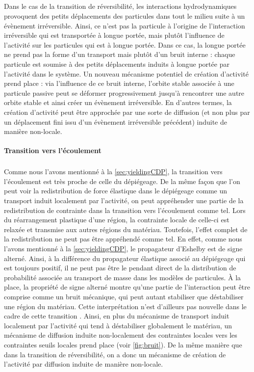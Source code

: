 \subparagraph{}Dans le cas de la transition de réversibilité, les interactions hydrodynamiques provoquent des petits déplacements des particules dans tout le milieu suite à un évènement irréversible. Ainsi, ce n'est pas la particule à l'origine de l'interaction irréversible qui est transportée à longue portée, mais plutôt l'influence de l'activité sur les particules qui est à longue portée. Dans ce cas, la longue portée ne prend pas la forme d'un transport mais plutôt d'un bruit interne : chaque particule est soumise à des petits déplacements induits à longue portée par l'activité dans le système. Un nouveau mécanisme potentiel de création d'activité prend place : via l'influence de ce bruit interne, l'orbite stable associée à une particule passive peut se déformer progressivement jusqu'à rencontrer une autre orbite stable et ainsi créer un évènement irréversible. En d'autres termes, la création d'activité peut être approchée par une sorte de diffusion (et non plus par un déplacement fini issu d'un évènement irréversible précédent) induite de manière non-locale.

\paragraph{Transition vers l'écoulement}

\subparagraph{}Comme nous l'avons mentionné à la \autoref{sec:yieldingCDP}, la transition vers l'écoulement est très proche de celle du dépiégeage. De la même façon que l'on peut voir la redistribution de force élastique dans le dépiégeage comme un transport induit localement par l'activité, on peut appréhender une partie de la redistribution de contrainte dans la transition vers l'écoulement comme tel. Lors du réarrangement plastique d'une région, la contrainte locale de celle-ci est relaxée et transmise aux autres régions du matériau. Toutefois, l'effet complet de la redistribution ne peut pas être appréhendé comme tel. En effet, comme nous l'avons mentionné à la \autoref{sec:yieldingCDP}, le propagateur d'Eshelby est de signe alterné. Ainsi, à la différence du propagateur élastique associé au dépiégeage qui est toujours positif, il ne peut pas être le pendant direct de la distribution de probabilité associée au transport de masse dans les modèles de particules. \`A la place, la propriété de signe alterné montre qu'une partie de l'interaction peut être comprise comme un bruit mécanique, qui peut autant stabiliser que déstabiliser une région du matériau. Cette interprétation n'est d'ailleurs pas nouvelle dans le cadre de cette transition \cite{lin_mean-field_2016, ferrero_criticality_2019}. Ainsi, en plus du mécanisme de transport induit localement par l'activité qui tend à déstabiliser globalement le matériau, un mécanisme de diffusion induite non-localement des contraintes locales vers les contraintes seuils locales prend place (voir \autoref{fig:bruit}). De la même manière que dans la transition de réversibilité, on a donc un mécanisme de création de l'activité par diffusion induite de manière non-locale.

